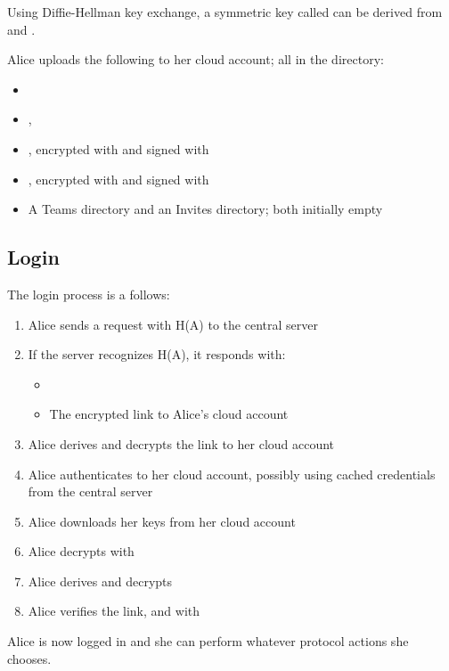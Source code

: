 \documentclass[pldi,10pt]{sigplanconf-pldi16}
\begin{document}
Using Diffie-Hellman key exchange, a symmetric key called  can be derived from  and .

Alice uploads the following to her cloud account; all in the  directory:

\begin{itemize}
\item {}
\item {}, 
\item {}, encrypted with  and signed with 
\item {}, encrypted with  and signed with 
\item A Teams directory and an Invites directory; both initially empty
\end{itemize}

\subsection{Login}

The login process is a follows:

\begin{enumerate}
\item Alice sends a request with H(A) to the central server
\item If the server recognizes H(A), it responds with:
  \begin{itemize}
  \item {}
  \item The encrypted link to Alice's cloud account
  \end{itemize}
\item Alice derives  and decrypts the link to her cloud account
\item Alice authenticates to her cloud account, possibly using cached credentials from the central server
\item Alice downloads her keys from her cloud account
\item Alice decrypts  with 
\item Alice derives  and decrypts 
\item Alice verifies the link,  and  with 
\end{enumerate}

Alice is now logged in and she can perform whatever protocol actions she chooses.
\end{document}
